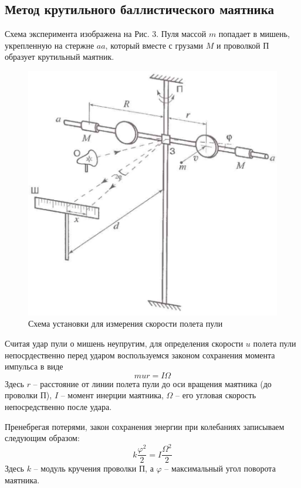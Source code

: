 \documentclass[a4paper,12pt]{article} %
\begin{document}
\subsection{Метод крутильного баллистического маятника}
Схема эксперимента изображена на Рис. 3. Пуля массой $m$ попадает в мишень, укрепленную на стержне $aa$, который вместе с грузами $M$  и проволкой П образует крутильный маятник.
\begin{figure}[h]
\centering
\includegraphics[scale = 0.4]{3}
\caption{Схема установки для измерения скорости полета пули}
\end{figure}
 Считая удар пули о мишень неупругим, для определения скорости $u$ полета пули непосрдественно перед ударом воспользуемся законом сохранения момента импульса в виде
 \begin{equation}
 mur=I\Omega
 \end{equation}
 Здесь $r$ -- расстояние от линии полета пули до оси вращения маятника (до проволки П), $I$ -- момент инерции маятника, $\Omega$ -- его угловая скорость непосредственно после удара.
 
 Пренебрегая потерями, закон сохранения энергии при колебаниях записываем следующим образом:
 \begin{equation}
 k\frac{\varphi^2}{2}=I\frac{\Omega^2}{2}
 \end{equation}
 Здесь $k$ -- модуль кручения проволки П, а $\varphi$ -- максимальный угол поворота маятника.
 
\end{document}
